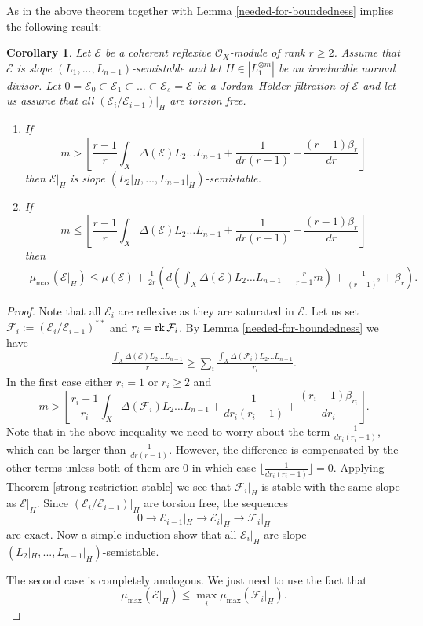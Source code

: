 \documentclass[12pt]{article}
\theoremstyle{plain}
\newtheorem{Corollary}[Thm]{\sc Corollary}
\theoremstyle{definition}
\theoremstyle{remark}
\newcommand{\cE}{{\mathcal E}}
\newcommand{\cF}{{\mathcal F}}
\newcommand{\cO}{{\mathcal O}}
\newcommand{\rk}{{\mathop{\rm rk \,}}}
\begin{document}
\medskip

As in \cite[Corollary  5.4]{La1}  the above theorem together with Lemma \ref{needed-for-boundedness} implies the following result:

\begin{Corollary}\label{Bogomolov-restriction}
	Let  $\cE$ be a coherent reflexive $\cO_X$-module of rank $r\ge 2$. Assume that $\cE$ is slope $(L_1,...,L_{n-1})$-semistable 	and let $H\in |L_1^{\otimes m}|$  be an irreducible normal divisor. 
Let $0= \cE_0\subset \cE_1\subset ...\subset \cE_s=\cE$ be a
	Jordan--H\"older filtration of $\cE$ and let us assume that all $(\cE_i/\cE_{i-1})|_H$ are torsion free.
	\begin{enumerate}
	\item 	If 
	$$m>\left\lfloor \frac{r-1}{ r}\int_X\Delta (\cE)L_2\dots L_{n-1} +\frac{1}{dr(r-1)}
	+\frac{(r-1)\beta _r}{dr}\right\rfloor$$
	then $\cE|_H$ is slope $(L_2|_H,...,L_{n-1}|_H)$-semistable.
	\item 	If
		$$m\le \left\lfloor \frac{r-1}{ r}\int_X\Delta (\cE)L_2\dots L_{n-1} +\frac{1}{dr(r-1)}
		+\frac{(r-1)\beta _r}{dr}\right\rfloor$$
		then
		\begin{align*}
			\mu _{\max} (\cE|_H)\le \mu (\cE)+
			\frac{1}{2r}\left( d  \left(\int_X \Delta (\cE )L_2\dots L_{n-1}-\frac{r}{r-1}m
			\right)+\frac{1}{(r-1)^2}+{\beta_r}\right).
		\end{align*}
	\end{enumerate}
\end{Corollary}

\begin{proof} Note that all $\cE_i$ are reflexive as they are saturated in 
	$\cE$.  Let us set $\cF_i:=(\cE_i/\cE_{i-1})^{**}$ and $r_i=\rk \cF_i$.
By	Lemma \ref{needed-for-boundedness} we have
	\begin{align*}
		\frac{\int _X \Delta  (\cE)L_2...L_{n-1}}{r}\ge \sum _i \frac{\int _X \Delta  (\cF_i)L_2...L_{n-1}}{r_i}.
	\end{align*}
In the first case either $r_i=1$ or $r_i\ge 2$ and
$$m>\left\lfloor \frac{r_i-1}{r_i}\int_X\Delta (\cF_i)L_2\dots L_{n-1} +\frac{1}{dr_i(r_i-1)}
+\frac{(r_i-1)\beta _{r_i}}{dr_i}\right\rfloor .$$
Note that in the above inequality we need to worry about the term 
$\frac{1}{dr_i(r_i-1)}$, which can be larger than $\frac{1}{dr(r-1)}$. However, the difference is compensated by the other terms unless both of them are 0 in which case $\lfloor \frac{1}{dr_i(r_i-1)}\rfloor =0$.
Applying Theorem \ref{strong-restriction-stable} we see that $\cF_i|_H$ is stable
with the same slope as $\cE|_H$.
Since $(\cE_i/\cE_{i-1})|_H$ are torsion free, the sequences
$$0\to \cE_{i-1}|_H\to \cE_i|_H\to \cF_i|_H$$
are exact. Now a simple induction show that all $\cE_i|_H$ are  slope $(L_2|_H,...,L_{n-1}|_H)$-semistable.

The second case is completely analogous. We just need to use the fact that
$$	\mu _{\max} (\cE|_H)\le	\max _i\mu _{\max} (\cF _i|_H).$$
\end{proof}
\end{document}

